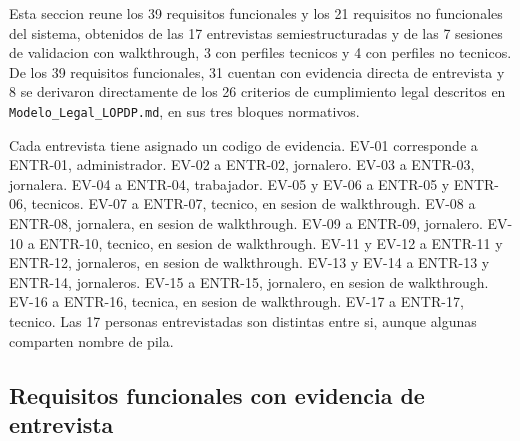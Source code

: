 \documentclass[11pt,a4paper]{article}
\newcommand{\ruta}[1]{\texttt{#1}}
\begin{document}
Esta seccion reune los 39 requisitos funcionales y los 21 requisitos no funcionales del sistema, obtenidos de las 17 entrevistas semiestructuradas y de las 7 sesiones de validacion con walkthrough, 3 con perfiles tecnicos y 4 con perfiles no tecnicos. De los 39 requisitos funcionales, 31 cuentan con evidencia directa de entrevista y 8 se derivaron directamente de los 26 criterios de cumplimiento legal descritos en \ruta{Modelo\_Legal\_LOPDP.md}, en sus tres bloques normativos.

Cada entrevista tiene asignado un codigo de evidencia. EV-01 corresponde a ENTR-01, administrador. EV-02 a ENTR-02, jornalero. EV-03 a ENTR-03, jornalera. EV-04 a ENTR-04, trabajador. EV-05 y EV-06 a ENTR-05 y ENTR-06, tecnicos. EV-07 a ENTR-07, tecnico, en sesion de walkthrough. EV-08 a ENTR-08, jornalera, en sesion de walkthrough. EV-09 a ENTR-09, jornalero. EV-10 a ENTR-10, tecnico, en sesion de walkthrough. EV-11 y EV-12 a ENTR-11 y ENTR-12, jornaleros, en sesion de walkthrough. EV-13 y EV-14 a ENTR-13 y ENTR-14, jornaleros. EV-15 a ENTR-15, jornalero, en sesion de walkthrough. EV-16 a ENTR-16, tecnica, en sesion de walkthrough. EV-17 a ENTR-17, tecnico. Las 17 personas entrevistadas son distintas entre si, aunque algunas comparten nombre de pila.

\subsection{Requisitos funcionales con evidencia de entrevista}
\end{document}
